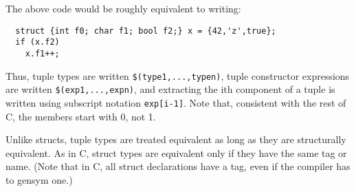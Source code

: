 The above code would be roughly equivalent to writing:
\begin{verbatim}
  struct {int f0; char f1; bool f2;} x = {42,'z',true};
  if (x.f2)
    x.f1++;
\end{verbatim}

Thus, tuple types are written \texttt{\$(type1,...,typen)}, tuple
constructor expressions are written \texttt{\$(exp1,...,expn)}, and
extracting the ith component of a tuple is written using subscript
notation \texttt{exp[i-1]}.  Note that, consistent with the rest of C,
the members start with 0, not 1.

Unlike structs, tuple types are treated equivalent as long as they are
structurally equivalent.  As in C, struct types are equivalent only if
they have the same tag or name.  (Note that in C, all struct
declarations have a tag, even if the compiler has to gensym one.)



